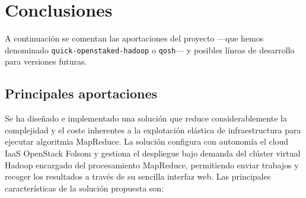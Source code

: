 \chapter*{Conclusiones}\label{cap:aportaciones}
\noindent A continuaci\'on se comentan las aportaciones del proyecto ---que hemos denominado \texttt{quick-openstaked-hadoop} o \texttt{qosh}--- y posibles l\'ineas de de\-sa\-rro\-llo para versiones futuras.

\section*{Principales aportaciones}\label{sec:bondadesdeficiencias}
\noindent Se ha dise\~nado e implementado una soluci\'on que reduce considerablemente la complejidad y el coste inherentes a la explotaci\'on el\'astica de infraestructura para ejecutar algoritmia MapReduce. La soluci\'on configura con autonom\'ia el cloud IaaS OpenStack Folsom y gestiona el despliegue bajo demanda del cl\'uster virtual Hadoop encargado del procesamiento MapReduce, permitiendo enviar trabajos y recoger los resultados a trav\'es de su sencilla interfaz web. Las principales caracter\'isticas de la soluci\'on propuesta son:

